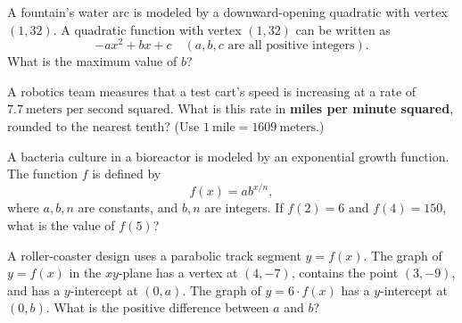 \vspace{0.75em}


\vspace{2em}
\newpage

\noindent\markforreview
\vspace{1em}

A fountain’s water arc is modeled by a downward-opening quadratic with vertex \((1, 32)\). A quadratic function with vertex \((1, 32)\) can be written as
\[
 -ax^2 + bx + c \quad (a, b, c \text{ are all positive integers}).
\]
What is the maximum value of \(b\)?


\vspace{2em}
\newpage

\noindent\markforreview
\vspace{1em}

A robotics team measures that a test cart’s speed is increasing at a rate of \(7.7\ \text{meters per second squared}\). What is this rate in \textbf{miles per minute squared}, rounded to the nearest tenth? (Use \(1\ \text{mile} = 1609\ \text{meters}\).)

\vspace{0.75em}


\vspace{2em}
\newpage

\noindent\markforreview
\vspace{1em}

A bacteria culture in a bioreactor is modeled by an exponential growth function. The function \(f\) is defined by
\[
f(x) = ab^{x/n},
\]
where \(a, b, n\) are constants, and \(b, n\) are integers. If \(f(2) = 6\) and \(f(4) = 150\), what is the value of \(f(5)\)?


\vspace{2em}
\newpage

\noindent\markforreview
\vspace{1em}

A roller-coaster design uses a parabolic track segment \(y = f(x)\). The graph of \(y = f(x)\) in the \(xy\)-plane has a vertex at \((4, -7)\), contains the point \((3, -9)\), and has a \(y\)-intercept at \((0, a)\). The graph of \(y = 6 \cdot f(x)\) has a \(y\)-intercept at \((0, b)\). What is the positive difference between \(a\) and \(b\)?


